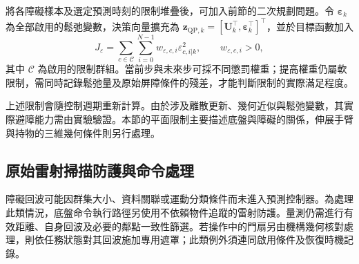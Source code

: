 將各障礙樣本及選定預測時刻的限制堆疊後，可加入前節的二次規劃問題。令 $\boldsymbol{\varepsilon}_k$ 為全部啟用的鬆弛變數，決策向量擴充為 $\mathbf{z}_{\mathrm{QP},k}=[\mathbf{U}_k^{\top},\boldsymbol{\varepsilon}_k^{\top}]^{\top}$，並於目標函數加入
\begin{equation}
    J_{\varepsilon}
    =\sum_{c\in\mathcal{C}}\sum_{i=0}^{N-1}
      w_{\varepsilon,c,i}\varepsilon_{c,i|k}^{2},
    \qquad w_{\varepsilon,c,i}>0,
    \label{eq:ch3_cbf_slack_cost}
\end{equation}
其中 $\mathcal{C}$ 為啟用的限制群組。當前步與未來步可採不同懲罰權重；提高權重仍屬軟限制，需同時記錄鬆弛量及原始屏障條件的殘差，才能判斷限制的實際滿足程度。

上述限制會隨控制週期重新計算。由於涉及離散更新、幾何近似與鬆弛變數，其實際避障能力需由實驗驗證。本節的平面限制主要描述底盤與障礙的關係，伸展手臂與持物的三維幾何條件則另行處理。

\subsection{原始雷射掃描防護與命令處理}
\label{subsec:raw_scan_command_protection}

障礙回波可能因群集大小、資料關聯或運動分類條件而未進入預測控制器。為處理此類情況，底盤命令執行路徑另使用不依賴物件追蹤的雷射防護。量測仍需進行有效距離、自身回波及必要的鄰點一致性篩選。若操作中的門扇另由機構幾何核對處理，則依任務狀態對其回波施加專用遮罩；此類例外須連同啟用條件及恢復時機記錄。

